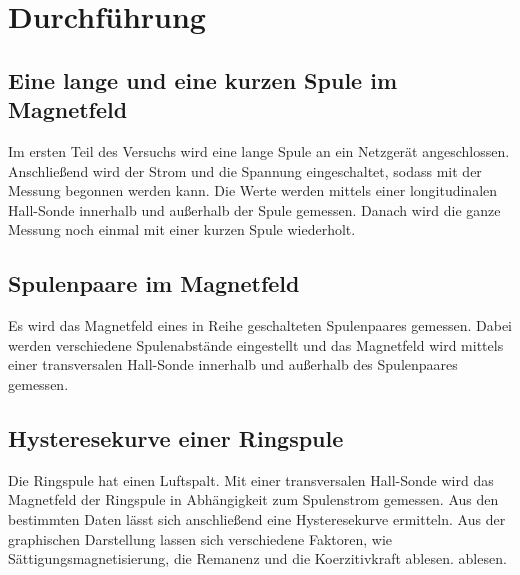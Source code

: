 \section{Durchführung}
\label{sec:Durchführung}

\subsection{Eine lange und eine kurzen Spule im Magnetfeld}
Im ersten Teil des Versuchs wird eine lange Spule an ein Netzgerät angeschlossen. 
Anschließend wird der Strom und die Spannung eingeschaltet, sodass mit der Messung 
begonnen werden kann. 
Die Werte werden mittels einer longitudinalen Hall-Sonde innerhalb und außerhalb der
Spule gemessen. Danach wird die ganze Messung noch einmal mit einer kurzen Spule 
wiederholt. 

\subsection{Spulenpaare im Magnetfeld}

Es wird das Magnetfeld eines in Reihe geschalteten Spulenpaares gemessen. Dabei werden verschiedene Spulenabstände eingestellt und das Magnetfeld wird mittels einer transversalen Hall-Sonde innerhalb und außerhalb des Spulenpaares gemessen. 

\subsection {Hysteresekurve einer Ringspule} 

Die Ringspule hat einen Luftspalt. Mit einer transversalen Hall-Sonde wird das Magnetfeld der Ringspule in Abhängigkeit zum Spulenstrom gemessen. Aus den bestimmten Daten lässt sich anschließend eine Hysteresekurve ermitteln. Aus der graphischen Darstellung lassen sich verschiedene Faktoren, wie Sättigungsmagnetisierung, die Remanenz und die Koerzitivkraft ablesen. ablesen.  
